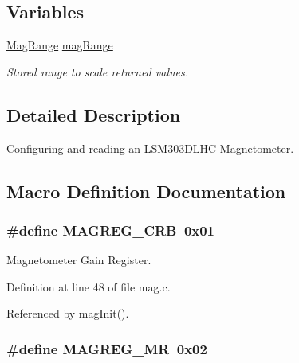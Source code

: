\subsection*{Variables}
\begin{DoxyCompactItemize}
\item 
\hyperlink{group__mag_ga3af649d913d146d6654db2354d88c18a}{Mag\-Range} \hyperlink{group__mag_gaae12e12b371d0bcebe05462384a519a2}{mag\-Range}
\begin{DoxyCompactList}\small\item\em Stored range to scale returned values. \end{DoxyCompactList}\end{DoxyCompactItemize}


\subsection{Detailed Description}
Configuring and reading an L\-S\-M303\-D\-L\-H\-C Magnetometer. 

\subsection{Macro Definition Documentation}
\hypertarget{group__mag_ga42f59dd3e4a9cb4d8d4dd4a1019b6ab5}{
\subsubsection[{M\-A\-G\-R\-E\-G\-\_\-\-C\-R\-B}]{\setlength{\rightskip}{0pt plus 5cm}\#define M\-A\-G\-R\-E\-G\-\_\-\-C\-R\-B~0x01}}\label{group__mag_ga42f59dd3e4a9cb4d8d4dd4a1019b6ab5}


Magnetometer Gain Register. 



Definition at line 48 of file mag.\-c.



Referenced by mag\-Init().

\hypertarget{group__mag_ga54eabf3b296f6550c9f6d9826020c623}{
\subsubsection[{M\-A\-G\-R\-E\-G\-\_\-\-M\-R}]{\setlength{\rightskip}{0pt plus 5cm}\#define M\-A\-G\-R\-E\-G\-\_\-\-M\-R~0x02}}\label{group__mag_ga54eabf3b296f6550c9f6d9826020c623}


